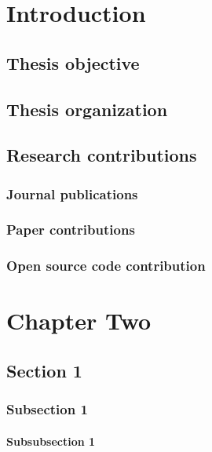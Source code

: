 \documentclass[12pt, TexShade, letterpaper]{report}
\begin{document}
	\tableofcontents\thispagestyle{plain}

	\listoffigures\thispagestyle{plain}
	\listoftables
	\glsaddall
	\setlength\LTleft{0pt}
	\setlength\LTright{0pt}
	\setlength\glsdescwidth{0.8\hsize}
	\printglossary[title={List of Acronyms}]

 	\clearpage
	
	\glsresetall
\chapter{Introduction}
	\section{Thesis objective}
	\section{Thesis organization}
    \section{Research contributions}
    	\subsection{Journal publications}
    	\subsection{Paper contributions}
    	\subsection{Open source code contribution}
	
\chapter{Chapter Two}
\section{Section 1}
\subsection{Subsection 1}
\subsubsection{Subsubsection 1}
\end{document}
